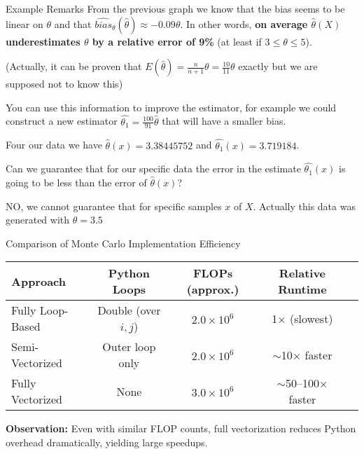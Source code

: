 \documentclass[8pt]{beamer}
\begin{document}
\begin{frame}{Example Remarks}
From the previous graph we know that the bias seems to be  linear on $\theta$ and that $\widehat{bias}_{\theta}(\hat{\theta}) \approx -0.09\theta$. In other words, {\bf on average $\hat{\theta}(X)$ underestimates $\theta$ by a relative error of 9\%} (at least if $3\leq \theta \leq 5$).
\vspace{2mm}

(Actually, it can be proven that $E(\hat{\theta})=\frac{n}{n+1}\theta=\frac{10}{11}\theta$ exactly but we are supposed not to know this)
\vspace{2mm}

You can use this information to improve the estimator, for example we could construct a new estimator $\hat{\theta_1}=\frac{100}{91}\hat{\theta}$ that will have a smaller bias.

\vspace{2mm}

Four our data we have $\hat{\theta}(x)=3.38445752$  and $\hat{\theta_1}(x)=3.719184$.

\vspace{2mm}

Can we guarantee that for our specific data the error in the estimate $\hat{\theta_1}(x)$ is going to be less than the error of $\hat{\theta}(x)$?

\vspace{2mm}

NO, we cannot guarantee that for specific samples $x$ of $X$. Actually this data was generated with $\theta=3.5$
\end{frame}

\begin{frame}{Comparison of Monte Carlo Implementation Efficiency}
\begin{table}[h!]
\centering
\renewcommand{\arraystretch}{1}
\begin{tabular}{lcccc}
\toprule
\textbf{Approach} & \textbf{Python Loops} & \textbf{FLOPs (approx.)} & \textbf{Relative Runtime} \\
\midrule
Fully Loop-Based & Double (over $i,j$) & $2.0\times10^6$ & 1× (slowest) \\
Semi-Vectorized & Outer loop only & $2.0\times10^6$ & $\sim$10× faster \\
Fully Vectorized & None & $3.0\times10^6$ & $\sim$50–100× faster \\
\bottomrule
\end{tabular}
\end{table}

\vspace{3mm}
\centering
\textbf{Observation:} Even with similar FLOP counts, full vectorization reduces Python overhead dramatically, yielding large speedups.
\end{frame}
\end{document}
